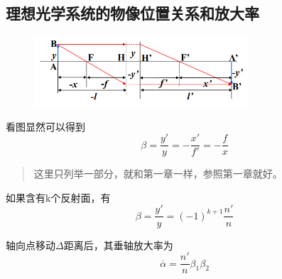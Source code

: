 \subsection{理想光学系统的物像位置关系和放大率}
        \begin{figure}[H]
            \centering
            \includegraphics[width=8cm]{img/3.3.png}
            \end{figure}
看图显然可以得到
\begin{equation}
\beta=\frac{y'}{y}=-\frac{x'}{f'}=-\frac{f}{x}\tag{2.3.5}
\end{equation}
\begin{quote}
{\ccwd\kaishu{}
这里只列举一部分，就和第一章一样，参照第一章就好。
}
\end{quote}
如果含有k个反射面，有
\begin{equation}
    \beta=\frac{y'}{y}=(-1)^{k+1}\frac{n'}{n} \tag{2.3.6}
\end{equation}

轴向点移动$\Delta$距离后，其垂轴放大率为
\begin{equation}
\overline{\alpha}=\frac{n'}{n}\beta_1\beta_2 \tag{2.3.7}
\end{equation}
